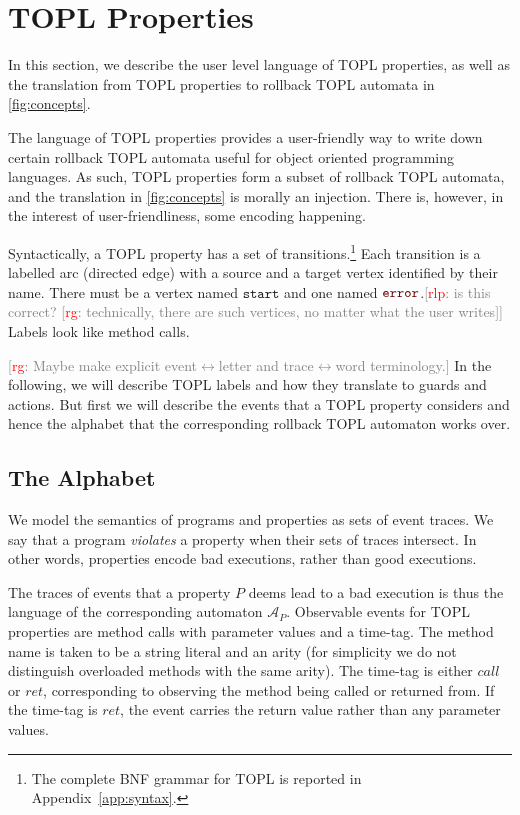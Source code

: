 \documentclass[9pt, preprint]{sigplanconf} %
\newcommand{\noterg}[2]{\textcolor{gray}{[\textcolor{red}{#1}: #2]}}
\newcommand{\rg}[1]{\noterg{rg}{#1}}
\newcommand{\rlp}[1]{\noterg{rlp}{#1}}
\newcommand{\A}{\ensuremath{\mathcal{A}}}
\newcommand{\error}{\ensuremath{\textcolor{darkred}{\mathtt{error}}}\xspace}
\newcommand{\start}{\ensuremath{\mathtt{start}}\xspace}
\theoremstyle{definition}
\theoremstyle{remark}
\begin{document}
\section{TOPL Properties}\label{sec:topl} %

In this section, we describe the user level language of TOPL
properties, as well as the translation from TOPL properties to
rollback TOPL automata in \autoref{fig:concepts}.

The language of TOPL properties provides a user-friendly way to write down certain
rollback TOPL automata useful for object oriented programming
languages. As such, TOPL properties form a subset of rollback TOPL
automata, and the translation in \autoref{fig:concepts} is morally an
injection. There is, however, in the interest of user-friendliness,
some encoding happening.

Syntactically, a TOPL property has a set of transitions.\footnote{The complete BNF grammar for TOPL is reported in Appendix~\ref{app:syntax}.}
Each transition is a labelled arc (directed edge) with a source and a
target vertex identified by their name.
There must be a vertex named \start and one named \error.\rlp{is
this correct? \rg{technically, there are such vertices, no matter what the user writes}}
Labels look like method calls.

\rg{Maybe make explicit event$\leftrightarrow$letter and trace$\leftrightarrow$word terminology.}
In the following, we will describe TOPL labels and how they translate to guards
and actions. But first we will describe the events that a TOPL
property considers and hence the alphabet that the corresponding
rollback TOPL automaton works over.

\subsection{The Alphabet}

We model the semantics of programs and properties as sets of event
traces. We say that a program \emph{violates} a property when their sets of traces intersect.
In other words, properties encode bad executions, rather than good executions.

The traces of events that a property $P$ deems lead to a bad execution is thus the language
of the corresponding automaton $\A_P$. Observable events for TOPL properties are method calls
with parameter values and a time-tag. The method name is taken to be a
string literal and an arity (for simplicity we do not distinguish
overloaded methods with the same arity). The time-tag is either $call$ or $ret$,
corresponding to observing the method being called or returned
from. If the time-tag is $ret$, the event carries the return value
rather than any parameter values.
\end{document}
